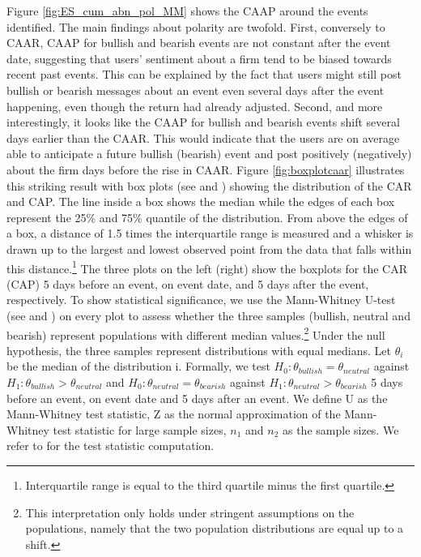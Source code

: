Figure \ref{fig:ES_cum_abn_pol_MM} shows the CAAP around the events identified. The main findings about polarity are twofold. First, conversely to CAAR, CAAP for bullish and bearish events are not constant after the event date, suggesting that users' sentiment about a firm tend to be biased towards recent past events. This can be explained by the fact that users might still post bullish or bearish messages about an event even several days after the event happening, even though the return had already adjusted. Second, and more interestingly, it looks like the CAAP for bullish and bearish events shift several days earlier than the CAAR. This would indicate that the users are on average able to anticipate a future bullish (bearish) event and post positively (negatively) about the firm days before the rise in CAAR. Figure \ref{fig:boxplotcaar} illustrates this striking result with box plots (see \citet{boxplot1} and \citet{boxplot2}) showing the distribution of the CAR and CAP. The line inside a box shows the median while the edges of each box represent the 25\% and 75\% quantile of the distribution. From above the edges of a box, a distance of 1.5 times the interquartile range is measured and a whisker is drawn up to the largest and lowest observed point from the data that falls within this distance.\footnote{Interquartile range is equal to the third quartile minus the first quartile.} The three plots on the left (right) show the boxplots for the CAR (CAP) 5 days before an event, on event date, and 5 days after the event, respectively. To show statistical significance, we use the Mann-Whitney U-test (see \citet{utest} and \citet{sheskin}) on every plot to assess whether the three samples (bullish, neutral and bearish) represent populations with different median values.\footnote{This interpretation only holds under stringent assumptions on the populations, namely that the two population distributions are equal up to a shift.}  Under the null hypothesis, the three samples represent distributions with equal medians.
 Let $\theta_i$ be the median of the distribution i. Formally, we test $H_0 : \theta_{bullish} = \theta_{neutral}$ against $H_1 : \theta_{bullish} > \theta_{neutral}$ and $H_0 : \theta_{neutral} = \theta_{bearish}$ against $H_1 : \theta_{neutral} > \theta_{bearish}$ 5 days before an event, on event date and 5 days after an event. We define U as the Mann-Whitney test statistic, Z as the normal approximation of the Mann-Whitney test statistic for large sample sizes, $n_1$ and $n_2$ as the sample sizes. We refer to \citet{sheskin} for the test statistic computation.
